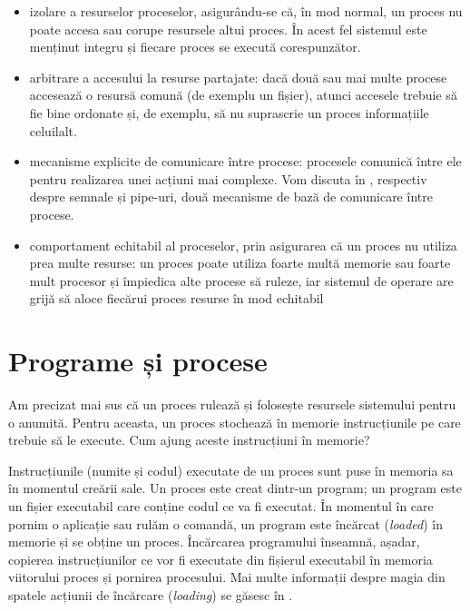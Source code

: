 \begin{itemize}
  \item izolare a resurselor proceselor, asigurându-se că, în mod normal, un proces nu poate accesa sau corupe resursele altui proces.
    În acest fel sistemul este menținut integru și fiecare proces se execută corespunzător.
  \item arbitrare a accesului la resurse partajate: dacă două sau mai multe procese accesează o resursă comună (de exemplu un fișier), atunci accesele trebuie să fie bine ordonate și, de exemplu, să nu suprascrie un proces informațiile celuilalt.
  \item mecanisme explicite de comunicare între procese: procesele comunică între ele pentru realizarea unei acțiuni mai complexe.
    Vom discuta în , respectiv  despre semnale și pipe-uri, două mecanisme de bază de comunicare între procese.
  \item comportament echitabil al proceselor, prin asigurarea că un proces nu utiliza prea multe resurse: un proces poate utiliza foarte multă memorie sau foarte mult procesor și împiedica alte procese să ruleze, iar sistemul de operare are grijă să aloce fiecărui proces resurse în mod echitabil
\end{itemize}

\section{Programe și procese}
\label{sec:process:process-program}

Am precizat mai sus că un proces rulează și folosește resursele sistemului pentru o anumită.
Pentru aceasta, un proces stochează în memorie instrucțiunile pe care trebuie să le execute.
Cum ajung aceste instrucțiuni în memorie?

Instrucțiunile (numite și codul) executate de un proces sunt puse în memoria sa în momentul creării sale.
Un proces este creat dintr-un program;
un program este un fișier executabil care conține codul ce va fi executat.
În momentul în care pornim o aplicație sau rulăm o comandă, un program este încărcat (\textit{loaded}) în memorie și se obține un proces.
Încărcarea programului înseamnă, așadar, copierea instrucțiunilor ce vor fi executate din fișierul executabil în memoria viitorului proces și pornirea procesului.
Mai multe informații despre magia din spatele acțiunii de încărcare (\textit{loading}) se găsesc în .

